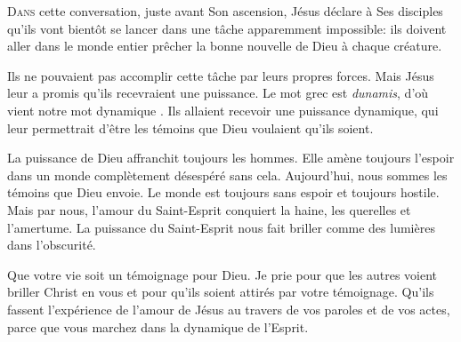 


\lettrine{D}{ans} cette conversation, juste avant Son ascension,
 Jésus déclare à Ses disciples qu'ils vont bientôt se lancer
 dans une tâche apparemment impossible:
 ils doivent aller dans le monde entier prêcher la bonne nouvelle
 de Dieu à chaque créature.

Ils ne pouvaient pas accomplir cette tâche par leurs propres forces.
 Mais Jésus leur a promis qu'ils recevraient une puissance.
 Le mot grec est \emph{dunamis}, d'où vient notre mot \Og dynamique \Fg{}.
 Ils allaient recevoir une puissance dynamique, qui leur permettrait
 d'être les témoins que Dieu voulaient qu'ils soient.


La puissance de Dieu affranchit toujours les hommes.
 Elle amène toujours l'espoir dans un monde complètement désespéré
 sans cela. Aujourd'hui, nous sommes les témoins que Dieu envoie.
 Le monde est toujours sans espoir et toujours hostile. Mais par nous,
 l'amour du Saint-Esprit conquiert la haine, les querelles et l'amertume.
 La puissance du Saint-Esprit nous fait briller
 comme des lumières dans l'obscurité.

Que votre vie soit un témoignage pour Dieu.
 Je prie pour que les autres voient briller Christ en vous
 et pour qu'ils soient attirés par votre témoignage.
 Qu'ils fassent l'expérience de l'amour de Jésus au travers de vos paroles
 et de vos actes, parce que vous marchez dans la dynamique de l'Esprit.

\dvrule







